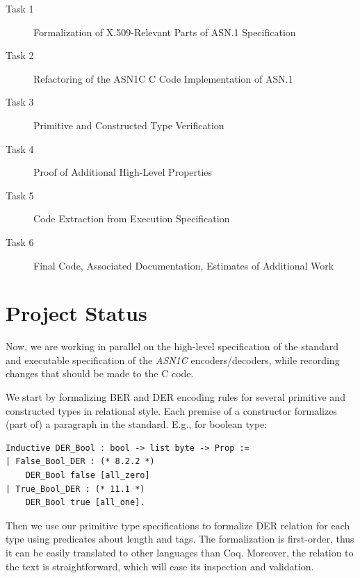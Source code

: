 \documentclass[10p,conference]{IEEEtran}
\begin{document}
\begin{description}

\item[Task 1] Formalization of X.509-Relevant Parts of ASN.1 Specification

\item[Task 2] Refactoring of the ASN1C C Code Implementation of ASN.1

\item[Task 3] Primitive and Constructed Type Verification

\item[Task 4] Proof of Additional High-Level Properties 

\item[Task 5] Code Extraction from Execution Specification

\item[Task 6] Final Code, Associated Documentation, Estimates of Additional Work
 \end{description}

\section{Project Status}

Now, we are working in parallel on the high-level specification of the standard and executable specification of the \emph{ASN1C} encoders/decoders,  while recording changes that should be made to the C code.

 We start by formalizing BER and DER encoding rules for several primitive and constructed types in relational style. Each premise of a constructor formalizes (part of) a paragraph in the standard. E.g., for boolean type:

\begin{lstlisting}[language=Coq]
Inductive DER_Bool : bool -> list byte -> Prop :=
| False_Bool_DER : (* 8.2.2 *)
    DER_Bool false [all_zero]
| True_Bool_DER : (* 11.1 *)
    DER_Bool true [all_one].
\end{lstlisting}

Then we use our primitive type specifications to formalize DER relation for each type using predicates about length and tags. The formalization is first-order, thus it can be easily translated to other languages than Coq. Moreover, the relation to the text is straightforward, which will ease its inspection and validation.
\end{document}

